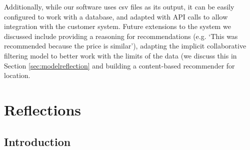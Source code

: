\documentclass{l3proj}
\begin{document}
Additionally, while our software uses csv files as its output, it can be easily configured to work with a database, and adapted with API calls to allow integration with the customer system. Future extensions to the system we discussed include providing a reasoning for recommendations (e.g. `This was recommended because the price is similar'), adapting the implicit collaborative filtering model to better work with the limits of the data (we discuss this in Section \ref{sec:modelreflection} and building a content-based recommender for location.

\newpage

\section{Reflections}
\label{sec:reflections}



\subsection{Introduction}
\label{sec:leadreflection}

%
% 
%
%
\end{document}
